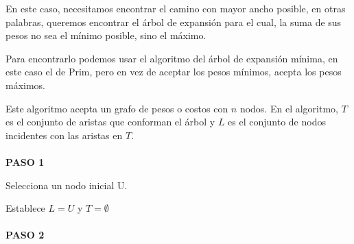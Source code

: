 \documentclass{article}
\begin{document}
%
%
%
%
%
En este caso, necesitamos encontrar el camino con mayor ancho posible,
en otras palabras, queremos encontrar el árbol de expansión para el cual, la
suma de sus pesos no sea el mínimo posible, sino el máximo.

Para encontrarlo podemos usar el algoritmo del árbol de expansión mínima, en
este caso el de Prim, pero en vez de aceptar los pesos mínimos, acepta los pesos
máximos.

Este algoritmo acepta un grafo de pesos o costos con $n$ nodos. En el algoritmo,
$T$ es el conjunto de aristas que conforman el árbol y $L$ es el conjunto de
nodos incidentes con las aristas en $T$.\\
\\
\textbf{PASO 1}

Selecciona un nodo inicial U.

Establece $L={U}$ y $T=\emptyset$\\
\\
\textbf{PASO 2}
\end{document}
